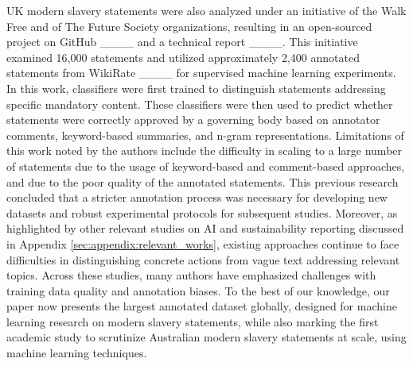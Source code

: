 UK modern slavery statements were also analyzed under an initiative of the Walk Free and of The Future Society organizations, resulting in an open-sourced project on GitHub ____ and a technical report ____. This initiative examined 16,000 statements and utilized approximately 2,400 annotated statements from WikiRate ____ for supervised machine learning experiments. In this work, classifiers were first trained to distinguish statements addressing specific mandatory content. These classifiers were then used to predict whether statements were correctly approved by a governing body based on annotator comments, keyword-based summaries, and n-gram representations. Limitations of this work noted by the authors include the difficulty in scaling to a large number of statements due to the usage of keyword-based and comment-based approaches, and due to the poor quality of the annotated statements. This previous research concluded that a stricter annotation process was necessary for developing new datasets and robust experimental protocols for subsequent studies. 
Moreover, as highlighted by other relevant studies on AI and sustainability reporting discussed in Appendix \ref{sec:appendix:relevant_works}, existing approaches continue to face difficulties in distinguishing concrete actions from vague text addressing relevant topics. Across these studies, many authors have emphasized challenges with training data quality and annotation biases. To the best of our knowledge, our paper now presents the largest annotated dataset globally, designed for machine learning research on modern slavery statements, while also marking the first academic study to scrutinize Australian modern slavery statements at scale, using machine learning techniques.